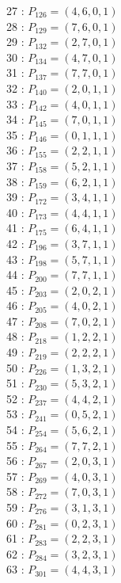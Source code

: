 \documentclass{article}
\begin{document}
{\begin{multicols}{3}
27 : $P_{126}=( 4, 6, 0, 1 )$\\
28 : $P_{129}=( 7, 6, 0, 1 )$\\
29 : $P_{132}=( 2, 7, 0, 1 )$\\
30 : $P_{134}=( 4, 7, 0, 1 )$\\
31 : $P_{137}=( 7, 7, 0, 1 )$\\
32 : $P_{140}=( 2, 0, 1, 1 )$\\
33 : $P_{142}=( 4, 0, 1, 1 )$\\
34 : $P_{145}=( 7, 0, 1, 1 )$\\
35 : $P_{146}=( 0, 1, 1, 1 )$\\
36 : $P_{155}=( 2, 2, 1, 1 )$\\
37 : $P_{158}=( 5, 2, 1, 1 )$\\
38 : $P_{159}=( 6, 2, 1, 1 )$\\
39 : $P_{172}=( 3, 4, 1, 1 )$\\
40 : $P_{173}=( 4, 4, 1, 1 )$\\
41 : $P_{175}=( 6, 4, 1, 1 )$\\
42 : $P_{196}=( 3, 7, 1, 1 )$\\
43 : $P_{198}=( 5, 7, 1, 1 )$\\
44 : $P_{200}=( 7, 7, 1, 1 )$\\
45 : $P_{203}=( 2, 0, 2, 1 )$\\
46 : $P_{205}=( 4, 0, 2, 1 )$\\
47 : $P_{208}=( 7, 0, 2, 1 )$\\
48 : $P_{218}=( 1, 2, 2, 1 )$\\
49 : $P_{219}=( 2, 2, 2, 1 )$\\
50 : $P_{226}=( 1, 3, 2, 1 )$\\
51 : $P_{230}=( 5, 3, 2, 1 )$\\
52 : $P_{237}=( 4, 4, 2, 1 )$\\
53 : $P_{241}=( 0, 5, 2, 1 )$\\
54 : $P_{254}=( 5, 6, 2, 1 )$\\
55 : $P_{264}=( 7, 7, 2, 1 )$\\
56 : $P_{267}=( 2, 0, 3, 1 )$\\
57 : $P_{269}=( 4, 0, 3, 1 )$\\
58 : $P_{272}=( 7, 0, 3, 1 )$\\
59 : $P_{276}=( 3, 1, 3, 1 )$\\
60 : $P_{281}=( 0, 2, 3, 1 )$\\
61 : $P_{283}=( 2, 2, 3, 1 )$\\
62 : $P_{284}=( 3, 2, 3, 1 )$\\
63 : $P_{301}=( 4, 4, 3, 1 )$\\

\end{multicols}}
\end{document}
